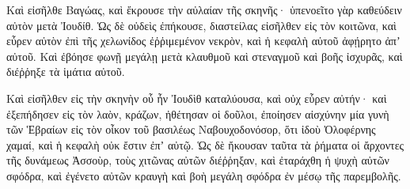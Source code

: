 {\par }{\PP {}Καὶ εἰσῆλθε Βαγώας, καὶ ἔκρουσε τὴν αὐλαίαν τῆς σκηνῆς· ὑπενοεῖτο γὰρ καθεύδειν αὐτὸν μετὰ Ἰουδίθ.
Ὡς δὲ οὐδεὶς ἐπήκουσε, διαστείλας εἰσῆλθεν εἰς τὸν κοιτῶνα, καὶ εὗρεν αὐτὸν ἐπὶ τῆς χελωνίδος ἐῤῥιμεμένον νεκρὸν, καὶ ἡ κεφαλὴ αὐτοῦ ἀφῄρητο ἀπʼ αὐτοῦ.
Καὶ ἐβόησε φωνῇ μεγάλῃ μετὰ κλαυθμοῦ καὶ στεναγμοῦ καὶ βοῆς ἰσχυρᾶς, καὶ διέῤῥηξε τὰ ἱμάτια αὐτοῦ.
\par }{\PP {}Καὶ εἰσῆλθεν εἰς τὴν σκηνὴν οὗ ἦν Ἰουδὶθ καταλύουσα, καὶ οὐχ εὗρεν αὐτήν· καὶ ἐξεπήδησεν εἰς τὸν λαὸν, κράζων,
ἠθέτησαν οἱ δοῦλοι, ἐποίησεν αἰσχύνην μία γυνὴ τῶν Ἑβραίων εἰς τὸν οἶκον τοῦ βασιλέως Ναβουχοδονόσορ, ὅτι ἰδοὺ Ὀλοφέρνης χαμαί, καὶ ἡ κεφαλὴ οὐκ ἔστιν ἐπʼ αὐτῷ.
Ὡς δὲ ἤκουσαν ταῦτα τὰ ῥήματα οἱ ἄρχοντες τῆς δυνάμεως Ἀσσοὺρ, τοὺς χιτῶνας αὐτῶν διέῤῥηξαν, καὶ ἐταράχθη ἡ ψυχὴ αὐτῶν σφόδρα, καὶ ἐγένετο αὐτῶν κραυγὴ καὶ βοὴ μεγάλη σφόδρα ἐν μέσῳ τῆς παρεμβολῆς.

}
